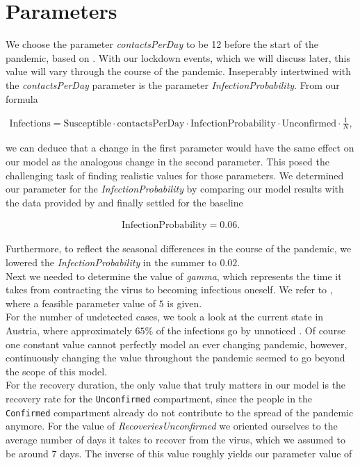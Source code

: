 \documentclass
[
    report,
    11pt,
    bibliography = totoc,
    listof = totoc,
    headinclude = true,
]
{scrreport}
\begin{document}
\FloatBarrier

\section{Parameters}

We choose the parameter \textit{contactsPerDay} to be 12 before the start of the pandemic,
based on \cite{Spiegel}. With our lockdown events, which we will discuss
later, this value will vary through the course of the pandemic.
Inseperably intertwined with the \textit{contactsPerDay} parameter is the parameter \textit{InfectionProbability}. From our formula

\begin{align*}
  \text{Infections} = \text{Susceptible} \cdot \text{contactsPerDay} \cdot
  \text{InfectionProbability} \cdot
  \text{Unconfirmed} \cdot \frac{1}{N},
\end{align*}

we can deduce that a change in the first parameter would have the same effect on our model
as the analogous change in the second parameter.
This posed the challenging task of finding realistic values for those parameters.
We determined our parameter for the \textit{InfectionProbability} by comparing
our model results with the data provided by \cite{OrfCorona} and finally
settled for the baseline

\begin{align*}
  \text{InfectionProbability} = 0.06.
\end{align*}

Furthermore, to reflect the seasonal differences in the course of the pandemic,
we lowered the \textit{InfectionProbability} in the summer to $0.02$. \\
Next we needed to determine the value of \textit{gamma}, which represents the time
it takes from contracting the virus to becoming infectious oneself.
We refer to \cite{RobertKochInstitut}, where a feasible parameter value of $5$ is given. \\
For the number of undetected cases, we took a look at the current state in Austria,
where approximately $65\%$ of the infections go by unnoticed \cite{MassTests}.
Of course one constant value cannot perfectly model an ever changing pandemic, however, continuously changing the value throughout the pandemic seemed to go beyond the scope of this model. \\
For the recovery duration, the only value that truly matters in our model
is the recovery rate for the \texttt{Unconfirmed} compartment, since the people in the
\texttt{Confirmed} compartment already do not contribute to the spread of the pandemic anymore.
For the value of \textit{RecoveriesUnconfirmed} we oriented ourselves to the average number of days
it takes to recover from the virus, which we assumed to be around $7$ days.
The inverse of this value roughly yields our parameter value of
\end{document}
